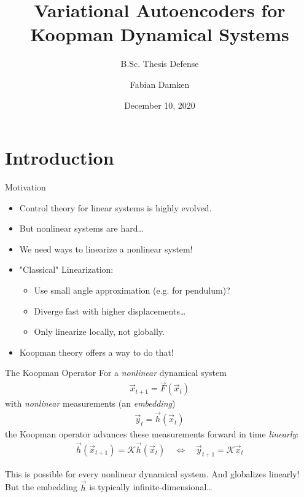 \documentclass[
	aspectratio=43,
	color={accentcolor=1c},
	logo=false,
	colorframetitle=true,
	handout
]{tudabeamer}
\title{Variational Autoencoders for Koopman Dynamical Systems}
\subtitle{B.Sc. Thesis Defense}
\author{Fabian Damken}
\institute{Intelligent Autonomous Systems}
\date{December 10, 2020}
\begin{document}
	\maketitle

	\section{Introduction}
		\begin{frame}{Motivation}
			\begin{itemize}
				\item Control theory for linear systems is highly evolved.
				\item But nonlinear systems are hard\dots
				\item We need ways to linearize a nonlinear system!
				\item<2-> "Classical" Linearization:
					\begin{itemize}
						\item Use small angle approximation (e.g. for pendulum)?
						\item Diverge fast with higher displacements\dots
						\item Only linearize locally, not globally.
					\end{itemize}
				\item<3-> Koopman theory offers a way to do that!
			\end{itemize}
		\end{frame}

		\begin{frame}{The Koopman Operator}
			For a \emph{nonlinear} dynamical system
			\begin{align*}
				\vec{x}_{t + 1} = \vec{F}(\vec{x}_{t})
			\end{align*}
			with \emph{nonlinear} measurements (an \emph{embedding})
			\begin{align*}
				\vec{y}_t = \vec{h}(\vec{x}_t)
			\end{align*}
			the Koopman operator advances these measurements forward in time \emph{linearly}:
			\begin{align*}
				\vec{h}(\vec{x}_{t + 1}) = \mathcal{K} \vec{h}(\vec{x}_t)
				\quad\iff\quad
				\vec{y}_{t + 1} = \mathcal{K} \vec{x}_t
			\end{align*}

			This is possible for every nonlinear dynamical system. And globalizes linearly! But the embedding \(\vec{h}\) is typically infinite-dimensional\dots
		\end{frame}
\end{document}
